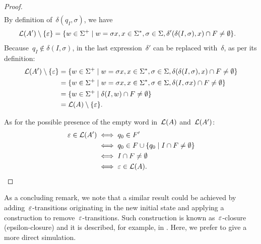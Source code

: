 \begin{proof}
\begin{align*}
	\end{align*}
	By definition of~$\delta(q_I,\sigma)$, we have
	\begin{align*}
		\mathcal L(A')\setminus\{\varepsilon\} & = \{w\in\Sigma^+\mid w=\sigma x, x\in\Sigma^*,\sigma\in\Sigma,\delta'(\delta(I,\sigma),x)\cap F\ne\emptyset\} \text.
	\end{align*}
	Because~$q_I\notin\delta(I,\sigma)$, in the last expression~$\delta'$ can be replaced with~$\delta$, as per its definition:
	\begin{align*}
		\mathcal L(A')\setminus\{\varepsilon\} & = \{w\in\Sigma^+\mid w=\sigma x, x\in\Sigma^*,\sigma\in\Sigma,\delta(\delta(I,\sigma),x)\cap F\ne\emptyset\} \\
		                                      & = \{w\in\Sigma^+\mid w=\sigma x, x\in\Sigma^*,\sigma\in\Sigma,\delta(I,\sigma x)\cap F\ne\emptyset\}         \\
		                                      & = \{w\in\Sigma^+\mid \delta(I,w)\cap F\ne\emptyset\}                                                            \\
		                                      & = \mathcal L(A)\setminus\{\varepsilon\} \text.
	\end{align*}

	As for the possible presence of the empty word in~$\mathcal L(A)$ and~$\mathcal L(A')$:
	\begin{align*}
		\varepsilon\in\mathcal L(A') & \iff q_0\in F'                                     \\
		                          & \iff q_0\in F\cup\{q_0\mid I\cap F\ne\emptyset\} \\
		                          & \iff I\cap F\ne\emptyset                           \\
		                          & \iff \varepsilon\in\mathcal L(A) \text. \qedhere
	\end{align*}
\end{proof}
As a concluding remark, we note that a similar result could be achieved by adding~$\varepsilon$-transitions originating in the new initial state and applying a construction to remove~$\varepsilon$-transitions.
Such construction is known as~$\varepsilon$-closure (epsilon-closure) and it is described, for example, in \cite[Theorem 2.2]{HopUll79}.
Here, we prefer to give a more direct simulation.


